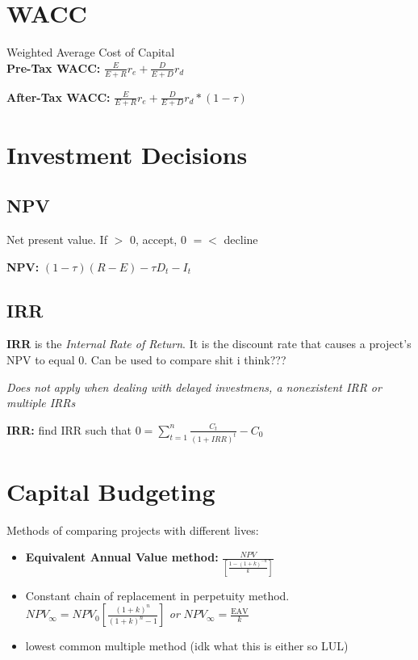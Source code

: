 \documentclass{report}
\begin{document}
\section{WACC}
\label{sec:wacc}
 Weighted Average Cost of Capital\\
\textbf{Pre-Tax WACC:} $\frac{E}{E+R}r_e+\frac{D}{E+D}r_d$

\textbf{After-Tax WACC:} $\frac{E}{E+R}r_e+\frac{D}{E+D}r_d*(1-\tau)$
\newpage
\section{Investment Decisions}
\label{sec:invdec}


\subsection{NPV}
\label{subsec:npv}
Net present value. If $>$ 0, accept, 0 $=<$ decline

\vspace*{1\baselineskip}

\textbf{NPV:} $(1-\tau)(R-E)-\tau D_t-I_t$

\subsection{IRR}
\label{sec:irr}

\textbf{IRR} is the \textit{Internal Rate of Return}. It is the discount rate that causes a project's NPV to equal 0. Can be used to compare shit i think???

\textit{Does not apply when dealing with delayed investmens, a nonexistent IRR or multiple IRRs}

\vspace*{1\baselineskip}
\textbf{IRR:} find IRR such that $0=\sum_{t=1}^n\frac{C_t}{(1+IRR)^t}-C_0$
\newpage
\section{Capital Budgeting}
\label{sec:capital-budgeting}

Methods of comparing projects with different lives:
\begin{itemize}
\item \textbf{Equivalent Annual Value method:} $\frac{NPV}{[\frac{1-(1+k)^{-n}}{k}]}$
\item Constant chain of replacement in perpetuity method. $NPV_{\infty}=NPV_0[\frac{(1+k)^n}{(1+k)^n-1}]$
  \textit{or}
  $NPV_{\infty}=\frac{\mbox{EAV}}{k}$

 
\item lowest common multiple method (idk what this is either so LUL)
\end{itemize}
\end{document}
